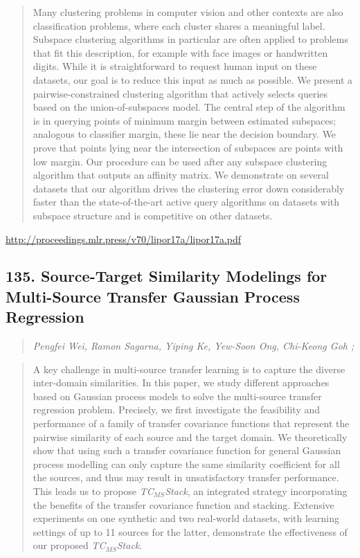 \documentclass{article}
\begin{document}
\begin{quote}
    Many clustering problems in computer vision and other contexts are also classification problems, where each cluster shares a meaningful label. Subspace clustering algorithms in particular are often applied to problems that fit this description, for example with face images or handwritten digits. While it is straightforward to request human input on these datasets, our goal is to reduce this input as much as possible. We present a pairwise-constrained clustering algorithm that actively selects queries based on the union-of-subspaces model. The central step of the algorithm is in querying points of minimum margin between estimated subspaces; analogous to classifier margin, these lie near the decision boundary. We prove that points lying near the intersection of subspaces are points with low margin. Our procedure can be used after any subspace clustering algorithm that outputs an affinity matrix. We demonstrate on several datasets that our algorithm drives the clustering error down considerably faster than the state-of-the-art active query algorithms on datasets with subspace structure and is competitive on other datasets.  
\end{quote}

\href{http://proceedings.mlr.press/v70/lipor17a/lipor17a.pdf}{http://proceedings.mlr.press/v70/lipor17a/lipor17a.pdf}

\subsection{135. Source-Target Similarity Modelings for Multi-Source Transfer Gaussian Process Regression}

\begin{quote}
\footnotesize{\textit{Pengfei Wei, Ramon Sagarna, Yiping Ke, Yew-Soon Ong, Chi-Keong Goh ;}}

\end{quote}

\begin{quote}
    A key challenge in multi-source transfer learning is to capture the diverse inter-domain similarities. In this paper, we study different approaches based on Gaussian process models to solve the multi-source transfer regression problem. Precisely, we first investigate the feasibility and performance of a family of transfer covariance functions that represent the pairwise similarity of each source and the target domain. We theoretically show that using such a transfer covariance function for general Gaussian process modelling can only capture the same similarity coefficient for all the sources, and thus may result in unsatisfactory transfer performance. This leads us to propose \textit{TC$_{MS}$Stack}, an integrated strategy incorporating the benefits of the transfer covariance function and stacking. Extensive experiments on one synthetic and two real-world datasets, with learning settings of up to 11 sources for the latter, demonstrate the effectiveness of our proposed \textit{TC$_{MS}$Stack}.  
\end{quote}
\end{document}
